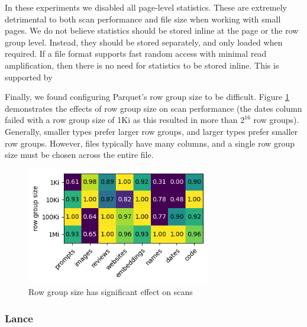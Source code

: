 \documentclass[sigconf, nonacm]{acmart}
\begin{document}
In these experiments we disabled all page-level statistics.  These are extremely detrimental to both scan performance and file size when working with small pages.  We do not believe statistics should be stored inline at the page or the row group level.  Instead, they should be stored separately, and only loaded when required.  If a file format supports fast random access with minimal read amplification, then there is no need for statistics to be stored inline.  This is supported by \cite{DecomposeFileFormat}

Finally, we found configuring Parquet's row group size to be difficult.  Figure \ref{fig:parquet-row-group-size} demonstrates the effects of row group size on scan performance (the dates column failed with a row group size of 1Ki as this resulted in more than $2^{16}$ row groups).  Generally, smaller types prefer larger row groups, and larger types prefer smaller row groups.  However, files typically have many columns, and a single row group size must be chosen across the entire file.

\begin{figure}[h]
    \centering
    \includegraphics[width=8cm]{figures/parquet_row_group.png}
    \caption{Row group size has significant effect on scans}
    \label{fig:parquet-row-group-size}
\end{figure}

\subsubsection{Lance}
\end{document}
